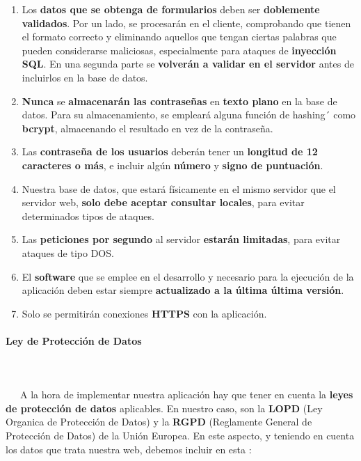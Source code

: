 \begin{enumerate}
	\item Los \textbf{datos que se obtenga de formularios} deben ser \textbf{doblemente validados}. Por un lado, se procesarán en el cliente, comprobando que tienen el formato correcto y eliminando aquellos que tengan ciertas palabras que pueden considerarse maliciosas, especialmente para ataques de \textbf{inyección SQL}. En una segunda parte se \textbf{volverán a validar en el servidor} antes de incluirlos en la base de datos.
	
	\item \textbf{Nunca} se \textbf{almacenarán las contraseñas} en \textbf{texto plano} en la base de datos. Para su almacenamiento, se empleará alguna función de \gls{hashing}´ como \textbf{bcrypt}, almacenando el resultado en vez de la contraseña.
	
	\item Las \textbf{contraseña de los usuarios} deberán tener un \textbf{longitud de 12 caracteres o más}, e incluir algún \textbf{número} y \textbf{signo de puntuación}.
	
	\item Nuestra base de datos, que estará físicamente en el mismo servidor que el servidor web, \textbf{solo debe aceptar consultar locales}, para evitar determinados tipos de ataques. 
	
	\item Las \textbf{peticiones por segundo} al servidor \textbf{estarán limitadas}, para evitar ataques de tipo \gls{DOS}.
	
	\item El \textbf{software} que se emplee en el desarrollo y necesario para la ejecución de la aplicación deben estar siempre \textbf{actualizado a la última última versión}.
	
	\item Solo se permitirán conexiones \textbf{HTTPS} con la aplicación.
\end{enumerate}

\paragraph{Ley de Protección de Datos}
~\\\\
\-\ \-\ \-\ A la hora de implementar nuestra aplicación hay que tener en cuenta la \textbf{leyes de protección de datos} aplicables. En nuestro caso, son la \textbf{LOPD} (Ley Organica de Protección de Datos) y la \textbf{RGPD} (Reglamente General de Protección de Datos) de la Unión Europea. En este aspecto, y teniendo en cuenta los datos que trata nuestra web, debemos incluir en esta \cite{lopd}:

